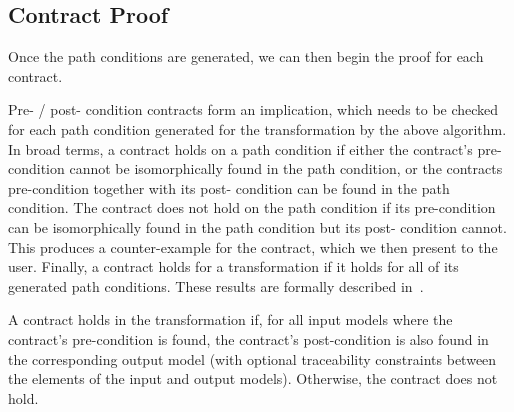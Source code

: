 \subsection{Contract Proof}

Once the path conditions are generated, we can then begin the proof for each contract.

Pre- / post- condition contracts form an implication, which
needs to be checked for each path condition generated for
the transformation by the above algorithm. In broad terms,
a contract holds on a path condition if either the contract’s
pre-condition cannot be isomorphically found in the path
condition, or the contracts pre-condition together with its post-
condition can be found in the path condition. The contract
does not hold on the path condition if its pre-condition can
be isomorphically found in the path condition but its post-
condition cannot. This produces a counter-example for the contract, which we then present to the user. Finally, a contract holds for a transformation if it holds for all of its generated path conditions. These results
are formally described in~\cite{Lucio2014}.

A contract holds in the transformation if, for all input models where the contract's pre-condition is found, the contract's post-condition is also found in the corresponding output model (with optional traceability constraints between the elements of the input and output models). Otherwise, the contract does not hold.


